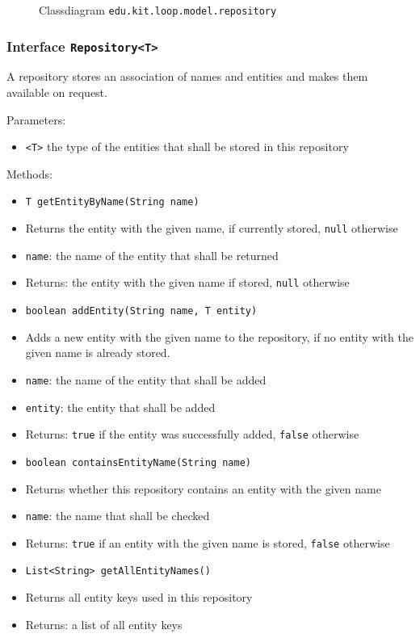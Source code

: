 \documentclass[parskip=full,11pt]{scrartcl}
\begin{document}
\iftrue
\begin{figure}[h]
	\centering
	\fontsize{7.5}{8}\selectfont
	

	\caption{Classdiagram \texttt{edu.kit.loop.model.repository}}
\end{figure}
\fi
\subsubsection{Interface \texttt{Repository<T>}}

A repository stores an association of names and entities and makes them available on request.

Parameters:
\begin{itemize}\itemsep -10pt
	\item \texttt{<T>} the type of the entities that shall be stored in this repository
\end{itemize}


Methods:
\begin{itemize}\itemsep -10pt
	\item \texttt{T getEntityByName(String name)}
	\item[] Returns the entity with the given name, if currently stored, \texttt{null} otherwise
	\item[] \texttt{name}: the name of the entity that shall be returned
	\item[] Returns: the entity with the given name if stored, \texttt{null} otherwise

	\item \texttt{boolean addEntity(String name, T entity)}
	\item[] Adds a new entity with the given name to the repository, if no entity with the given name is already stored.
	\item[] \texttt{name}: the name of the entity that shall be added
	\item[] \texttt{entity}: the entity that shall be added
	\item[] Returns: \texttt{true} if the entity was successfully added, \texttt{false} otherwise

	\item \texttt{boolean containsEntityName(String name)}
	\item[] Returns whether this repository contains an entity with the given name
	\item[] \texttt{name}: the name that shall be checked
	\item[] Returns: \texttt{true} if an entity with the given name is stored, \texttt{false} otherwise

	\item \texttt{List<String> getAllEntityNames()}
	\item[] Returns all entity keys used in this repository
	\item[] Returns: a list of all entity keys

\end{itemize}
\end{document}
